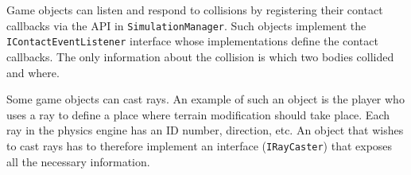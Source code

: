 Game objects can listen and respond to collisions by registering their contact callbacks via the API in \texttt{SimulationManager}.
Such objects implement the \texttt{IContactEventListener} interface whose implementations define the contact callbacks.
The only information about the collision is which two bodies collided and where.

Some game objects can cast rays.
An example of such an object is the player who uses a ray to define a place where terrain modification should take place.
Each ray in the physics engine has an ID number, direction, etc.
An object that wishes to cast rays has to therefore implement an interface (\texttt{IRayCaster}) that exposes all the necessary information.